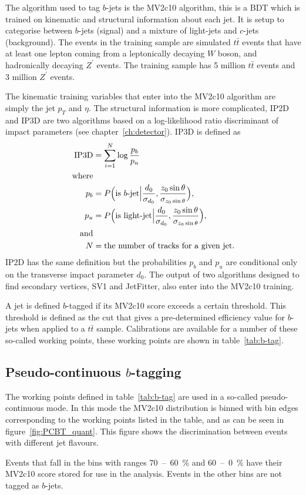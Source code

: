The algorithm used to tag $b$-jets is the MV2c10 algorithm, this is a BDT which is
trained on kinematic and structural information about each jet. It is setup to
categorise between $b$-jets (signal) and a mixture of light-jets and $c$-jets
(background). The events in the training sample are simulated $t\bar{t}$ events
that have at least one lepton coming from a leptonically decaying $W$ boson, and
hadronically decaying $Z^\prime$ events. The training sample has 5 million
$t\bar{t}$ events and 3 million $Z^\prime$ events.

The kinematic training variables that enter into the MV2c10 algorithm are simply
the jet $p_T$ and $\eta$. The structural information is more complicated, IP2D
and IP3D are two algorithms based on a log-likelihood ratio discriminant of
impact parameters (see chapter~\ref{ch:detector}). IP3D is defined as
\begin{align}
  \text{IP3D} &=\sum_{i=1}^{N}\log{\frac{p_b}{p_u}} \\
  \text{where}& \notag \\
  p_b &= P\Big(\text{is }b\text{-jet} \Big\vert \frac{d_0}{\sigma_{d_0}},
        \frac{z_0 \sin{\theta}}{\sigma_{z_0\sin{\theta}}}\Big),\\
  p_u &= P\Big(\text{is light-jet} \Big\vert \frac{d_0}{\sigma_{d_0}},
        \frac{z_0 \sin{\theta}}{\sigma_{z_0\sin{\theta}}}\Big),\\
  \text{and} & \notag \\
  N &= \text{the number of tracks for a given jet.} \notag
\end{align}
IP2D has the same definition but the probabilities $p_b$ and $p_u$ are
conditional only on the transverse impact parameter $d_0$. The output of two
algorithms designed to find secondary vertices, SV1 and JetFitter, also enter
into the MV2c10 training.

A jet is defined $b$-tagged if its MV2c10 score exceeds a certain threshold. This
threshold is defined as the cut that gives a pre-determined efficiency value for
$b$-jets when applied to a $t\bar{t}$ sample. Calibrations are available for a
number of these so-called working points, these working points are shown in
table~\ref{tab:b-tag}.


\subsection{Pseudo-continuous $b$-tagging}
The working points defined in table~\ref{tab:b-tag} are used in a so-called
pseudo-continuous mode. In this mode the MV2c10 distribution is binned with bin
edges corresponding to the working points listed in the table, and as can be
seen in figure~\ref{fig:PCBT_quant}. This figure shows the discrimination between
events with different jet flavours. 

Events that fall in the bins with ranges 70~--~60~\% and 60~--~0~\% have their
MV2c10 score stored for use in the analysis. Events in the other bins are not
tagged as $b$-jets.

